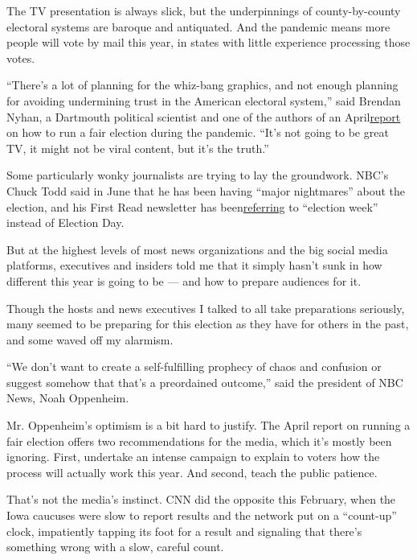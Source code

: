 The TV presentation is always slick, but the underpinnings of
county-by-county electoral systems are baroque and antiquated. And the
pandemic means more people will vote by mail this year, in states with
little experience processing those votes.

``There's a lot of planning for the whiz-bang graphics, and not enough
planning for avoiding undermining trust in the American electoral
system,'' said Brendan Nyhan, a Dartmouth political scientist and one of
the authors of an
April\href{https://www.law.uci.edu/faculty/full-time/hasen/2020ElectionReport.pdf}{report}
on how to run a fair election during the pandemic. ``It's not going to
be great TV, it might not be viral content, but it's the truth.''

Some particularly wonky journalists are trying to lay the groundwork.
NBC's Chuck Todd said in June that he has been having ``major
nightmares'' about the election, and his First Read newsletter has
been\href{https://www.nbcnews.com/politics/meet-the-press/say-goodbye-election-night-hello-election-week-n1228206}{referring}
to ``election week'' instead of Election Day.

But at the highest levels of most news organizations and the big social
media platforms, executives and insiders told me that it simply hasn't
sunk in how different this year is going to be --- and how to prepare
audiences for it.

Though the hosts and news executives I talked to all take preparations
seriously, many seemed to be preparing for this election as they have
for others in the past, and some waved off my alarmism.

``We don't want to create a self-fulfilling prophecy of chaos and
confusion or suggest somehow that that's a preordained outcome,'' said
the president of NBC News, Noah Oppenheim.

Mr. Oppenheim's optimism is a bit hard to justify. The April report on
running a fair election offers two recommendations for the media, which
it's mostly been ignoring. First, undertake an intense campaign to
explain to voters how the process will actually work this year. And
second, teach the public patience.

That's not the media's instinct. CNN did the opposite this February,
when the Iowa caucuses were slow to report results and the network put
on a ``count-up'' clock, impatiently tapping its foot for a result and
signaling that there's something wrong with a slow, careful count.

